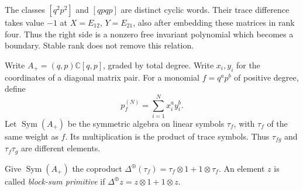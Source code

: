 The classes $[q^2p^2]$ and $[qpqp]$ are distinct cyclic words.
Their trace difference takes value $-1$ at
$X=E_{12}$, $Y=E_{21}$, also after embedding these matrices in
rank four. Thus the right side is a nonzero free invariant
polynomial which becomes a boundary. Stable rank does not remove
this relation.

Write $A_+=(q,p)\mathbb C[q,p]$, graded by total degree.
Write $x_i,y_i$ for the coordinates of a diagonal matrix pair.
For a monomial $f=q^ap^b$ of positive degree, define
\[
 p_f^{(N)}=\sum_{i=1}^N x_i^a y_i^b.
\]
Let $\operatorname{Sym}(A_+)$ be the symmetric algebra on
linear symbols $\tau_f$, with $\tau_f$ of the same weight as $f$.
Its multiplication is the product of trace symbols. Thus
$\tau_{fg}$ and $\tau_f\tau_g$ are different elements.

Give $\operatorname{Sym}(A_+)$ the coproduct
$\Delta^\oplus(\tau_f)=\tau_f\otimes1+1\otimes\tau_f$.
An element $z$ is called \emph{block-sum primitive} if
$\Delta^\oplus z=z\otimes1+1\otimes z$.


